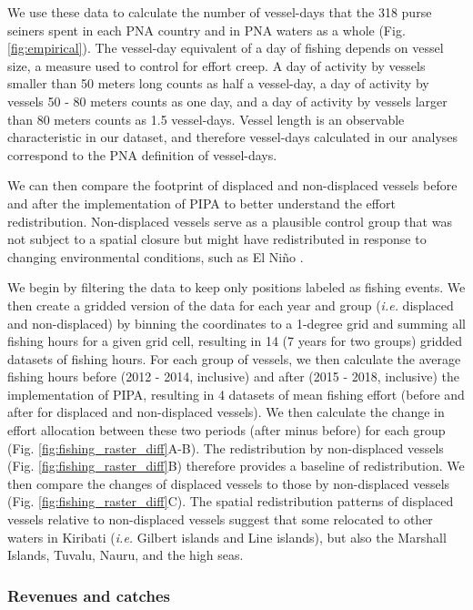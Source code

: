 \documentclass[12pt]{article}
\begin{document}
We use these data to calculate the number of vessel-days that the 318 purse seiners spent in each PNA country and in PNA waters as a whole (Fig. \ref{fig:empirical}). The vessel-day equivalent of a day of fishing depends on vessel size, a measure used to control for effort creep. A day of activity by vessels smaller than 50 meters long counts as half a vessel-day, a day of activity by vessels 50 - 80 meters counts as one day, and a day of activity by vessels larger than 80 meters counts as 1.5 vessel-days. Vessel length is an observable characteristic in our dataset, and therefore vessel-days calculated in our analyses correspond to the PNA definition of vessel-days.

We can then compare the footprint of displaced and non-displaced vessels before and after the implementation of PIPA to better understand the effort redistribution. Non-displaced vessels serve as a plausible control group that was not subject to a spatial closure but might have redistributed in response to changing environmental conditions, such as El Ni\~no \cite{hanich2018unraveling,aqorau_2018}.

We begin by filtering the data to keep only positions labeled as fishing events. We then create a gridded version of the data for each year and group (\emph{i.e.} displaced and non-displaced) by binning the coordinates to a 1-degree grid and summing all fishing hours for a given grid cell, resulting in 14 (7 years for two groups) gridded datasets of fishing hours. For each group of vessels, we then calculate the average fishing hours before (2012 - 2014, inclusive) and after (2015 - 2018, inclusive) the implementation of PIPA, resulting in 4 datasets of mean fishing effort (before and after for displaced and non-displaced vessels). We then calculate the change in effort allocation between these two periods (after minus before) for each group (Fig. \ref{fig:fishing_raster_diff}A-B). The redistribution by non-displaced vessels (Fig. \ref{fig:fishing_raster_diff}B) therefore provides a baseline of redistribution. We then compare the changes of displaced vessels to those by non-displaced vessels (Fig. \ref{fig:fishing_raster_diff}C). The spatial redistribution patterns of displaced vessels relative to non-displaced vessels suggest that some relocated to other waters in Kiribati (\emph{i.e.} Gilbert islands and Line islands), but also the Marshall Islands, Tuvalu, Nauru, and the high seas.

\subsubsection{Revenues and catches}
\end{document}
